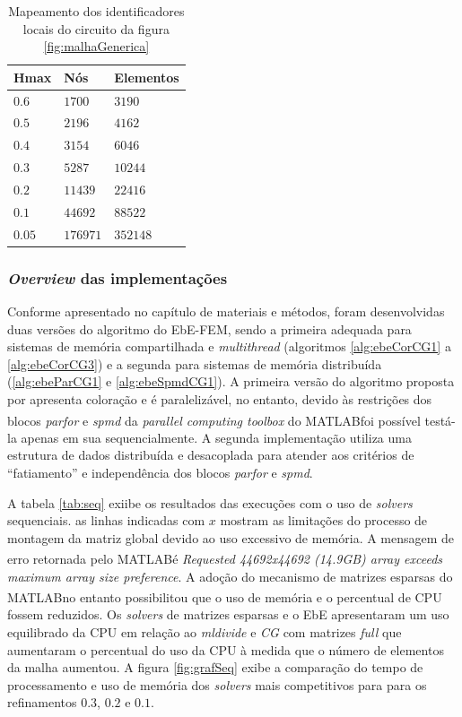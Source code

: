 \documentclass[
    12pt,               %
    openright,          %
    oneside,
    a4paper,            %
    english,            %
    french,             %
    spanish,            %
    brazil              %
    ]{abntex2}
\newcommand{\matlab}{MATLAB\textsuperscript{\textregistered}}
\begin{document}
 \begin{table}
	\centering
	\begin{tabular}{|l|l|l|}  
		\hline
		\textbf{Hmax} & \textbf{Nós} & \textbf{Elementos} \\ 
		\hline
		$0.6$ & $1700$ & $3190$ \\
		\hline
		$0.5$ & $2196$ & $4162$ \\
		\hline
		$0.4$ & $3154$ & $6046$ \\
		\hline
		$0.3$ & $5287$ & $10244$ \\
		\hline
		$0.2$ & $11439$ & $22416$ \\       
		\hline
		$0.1$ & $44692$ & $88522$ \\       
		\hline
		$0.05$ & $176971$ & $352148$ \\       
		\hline				
	\end{tabular}
	\caption{Mapeamento dos identificadores locais do circuito da figura \ref{fig:malhaGenerica}}
	\label{tab:hmax}
\end{table}

\subsubsection*{\textit{Overview} das implementações}
Conforme apresentado no capítulo de materiais e métodos, foram desenvolvidas duas versões do algoritmo  do EbE-FEM, sendo a primeira adequada para sistemas de memória compartilhada e \textit{multithread} (algoritmos \ref{alg:ebeCorCG1} a \ref{alg:ebeCorCG3}) e a segunda para sistemas de memória distribuída (\ref{alg:ebeParCG1} e \ref{alg:ebeSpmdCG1}).
A primeira versão do algoritmo proposta por  apresenta coloração e é paralelizável, no entanto, devido às restrições dos blocos \textit{parfor} e \textit{spmd} da \textit{parallel computing toolbox} do \matlab foi possível testá-la apenas em sua sequencialmente.
A segunda implementação utiliza uma estrutura de dados distribuída e desacoplada para atender aos critérios de ``fatiamento'' e independência dos blocos \textit{parfor} e \textit{spmd}.

A tabela \ref{tab:seq} exiibe os resultados das execuções com o uso de \textit{solvers} sequenciais. as linhas indicadas com $x$ mostram as limitações do processo de montagem da matriz global devido ao uso excessivo de memória. A mensagem de erro retornada pelo \matlab é \textit{Requested 44692x44692 (14.9GB) array exceeds maximum array size preference}. A adoção do mecanismo de matrizes esparsas do \matlab no entanto possibilitou que o uso de memória e o percentual de CPU fossem reduzidos. Os \textit{solvers} de matrizes esparsas e o EbE apresentaram um uso equilibrado da CPU em relação ao \textit{mldivide} e \textit{CG} com matrizes \textit{full} que aumentaram o percentual do uso da CPU à medida que o número de elementos da malha aumentou. A figura \ref{fig:grafSeq} exibe a comparação do tempo de processamento e uso de memória dos \textit{solvers} mais competitivos para para os refinamentos $0.3$, $0.2$ e $0.1$.
\end{document}

